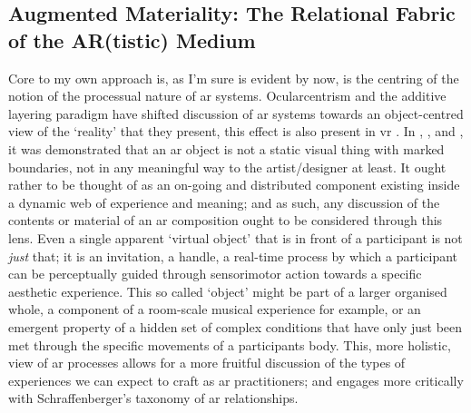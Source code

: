 \subsection[Augmented Materiality]{Augmented Materiality: The Relational Fabric of the AR(tistic) Medium}\label{sec: discussion-medium-material}
Core to my own approach is, as I'm sure is evident by now, is the centring of the notion of the processual nature of \gls{ar} systems. Ocularcentrism and the additive layering paradigm have shifted discussion of \gls{ar} systems towards an object-centred view of the `reality' that they present, this effect is also present in \gls{vr} \citep[]{hovhannisyan2019}. In \textit{}, \textit{}, and \textit{}, it was demonstrated that an \gls{ar} object is not a static visual thing with marked boundaries, not in any meaningful way to the artist/designer at least. It ought rather to be thought of as an on-going and distributed component existing inside a dynamic web of experience and meaning; and as such, any discussion of the contents or material of an \gls{ar} composition ought to be considered through this lens. Even a single apparent `virtual object' that is in front of a participant is not \textit{just} that; it is an invitation, a handle, a real-time process by which a participant can be perceptually guided through sensorimotor action towards a specific aesthetic experience. This so called `object' might be part of a larger organised whole, a component of a room-scale musical experience for example, or an emergent property of a hidden set of complex conditions that have only just been met through the specific movements of a participants body. This, more holistic, view of \gls{ar} processes allows for a more fruitful discussion of the types of experiences we can expect to craft as \gls{ar} practitioners; and engages more critically with Schraffenberger's taxonomy of \gls{ar} relationships.

